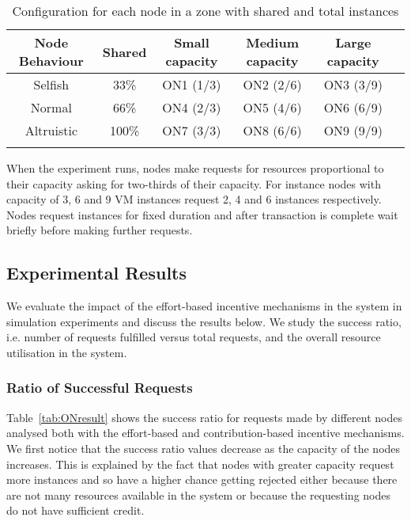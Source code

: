 \begin{table}[htb]
\renewcommand{\arraystretch}{1.3}
\footnotesize
\centering
     \caption{Configuration for each node in a zone with shared and total instances}
    \begin{tabular}{@{} cc c c c c @{}}
    \hline
    {Node Behaviour} & {Shared} & Small capacity & Medium capacity & Large capacity   \\  \hline
    {Selfish} & 33\% 	& ON1 (1/3) & ON2 (2/6) & ON3 (3/9) & \\ 
	{Normal} & 66\% 	& ON4 (2/3) & ON5 (4/6) & ON6 (6/9) & \\ 
	{Altruistic} & 100\%& ON7 (3/3) & ON8 (6/6) & ON9 (9/9) & \\ \hline
    \label{tab:ONconf}
    \end{tabular}
\end{table}

When the experiment runs, nodes make requests for resources proportional to their capacity asking for two-thirds of their capacity.
For instance nodes with capacity of 3, 6 and 9 VM instances request 2, 4 and 6 instances respectively.
Nodes request instances for fixed duration and after transaction is complete wait briefly before making further requests.

\subsection{Experimental Results}

We evaluate the impact of the effort-based incentive mechanisms in the system in simulation experiments and discuss the results below.
We study the success ratio, i.e. number of requests fulfilled versus total requests, and the overall resource utilisation in the system.

\subsubsection{Ratio of Successful Requests}

Table~\ref{tab:ONresult} shows the success ratio for requests made by different nodes analysed both with the effort-based and contribution-based incentive mechanisms. 
We first notice that the success ratio values decrease as the capacity of the nodes increases. 
This is explained by the fact that nodes with greater capacity request more instances and so have a higher chance getting rejected either because there are not many resources available in the system or because the requesting nodes do not have sufficient credit.

